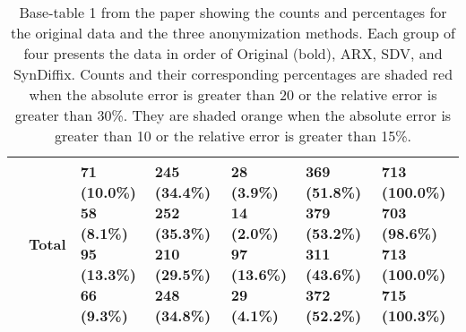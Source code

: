 \begin{table}
\begin{center}
\begin{small}
\begin{tabular}{lllllll}
& Total      & \makecell[l]{\textbf{71 (10.0\%)} \\58 (8.1\%) \\95 (13.3\%) \\66 (9.3\%) \\}      & \makecell[l]{\textbf{245 (34.4\%)} \\252 (35.3\%) \\210 (29.5\%) \\248 (34.8\%) \\}      & \makecell[l]{\textbf{28 (3.9\%)} \\14 (2.0\%) \\97 (13.6\%) \\29 (4.1\%) \\}      & \makecell[l]{\textbf{369 (51.8\%)} \\379 (53.2\%) \\311 (43.6\%) \\372 (52.2\%) \\}      & \makecell[l]{\textbf{713 (100.0\%)} \\703 (98.6\%)  \\713 (100.0\%)  \\715 (100.3\%)  \\} \\ 

      \bottomrule
      \end{tabular}
      \end{small}
      \caption{Base-table 1 from the paper showing the counts and percentages for the original data and the three anonymization methods. Each group of four presents the data in order of Original (bold), ARX, SDV, and SynDiffix. Counts and their corresponding percentages are shaded \colorbox{color-very-bad}{red} when the absolute error is greater than 20 or the relative error is greater than 30\%. They are shaded \colorbox{color-bad}{orange} when the absolute error is greater than 10 or the relative error is greater than 15\%.}
      \label{tab:table1}
      \end{center}
      \end{table}
      \setlength{\fboxsep}{3pt}
    